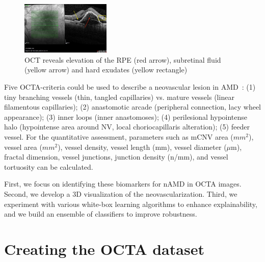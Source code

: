 \documentclass[conference]{IEEEtran}
\begin{document}
\begin{figure}
    \centering
    \includegraphics[width=0.38\textwidth]{fig/Fig2.jpg}
    \caption{OCT reveals elevation of the RPE (red arrow), subretinal fluid (yellow arrow) and hard exudates (yellow rectangle)}
    \label{fig:oct}
\end{figure}

Five OCTA-criteria could be used to describe a neovascular lesion in AMD~\cite{wang2021optical}:
(1) tiny branching vessels (thin, tangled capillaries) vs. mature vessels (linear filamentous capillaries); 
(2) anastomotic arcade (peripheral connection, lacy wheel appearance); 
(3) inner loops (inner anastomoses); 
(4) perilesional hypointense halo (hypointense area around NV, local choriocapillaris alteration);
(5) feeder vessel.
For the quantitative assessment, parameters such as mCNV area ($mm^2$), vessel area ($mm^2$), vessel density, vessel length (mm), vessel diameter ($\mu$m), fractal dimension, vessel junctions, junction density (n/mm), and vessel tortuosity can be calculated.

First, we focus on identifying these biomarkers for nAMD in OCTA images. Second, we develop a 3D visualization of the neovascularization. Third, we experiment with various white-box learning algorithms to enhance explainability, and we build an ensemble of classifiers to improve robustness.

\section{Creating the OCTA dataset}
\end{document}
